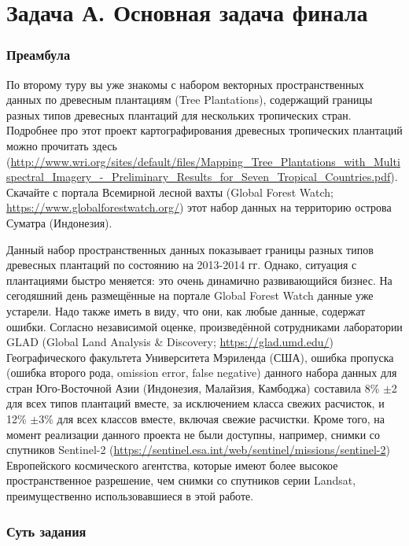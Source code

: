 \section{Задача А. Основная задача финала}

\subsubsection*{Преамбула}

По второму туру вы уже знакомы с набором векторных пространственных данных по древесным плантациям (Tree Plantations), содержащий границы разных типов древесных плантаций для нескольких тропических стран. Подробнее про этот проект картографирования древесных тропических плантаций можно прочитать здесь (\url{http://www.wri.org/sites/default/files/Mapping_Tree_Plantations_with_Mult}\linebreak \url{ispectral_Imagery_-_Preliminary_Results_for_Seven_Tropical_Countries.pdf}). \linebreak Скачайте с портала Всемирной лесной вахты (Global Forest Watch; \url{https://www.globalforestwatch.org/}) этот набор данных на территорию острова Суматра (Индонезия).

Данный набор пространственных данных показывает границы разных типов древесных плантаций по состоянию на 2013-2014 гг. Однако, ситуация с плантациями быстро меняется: это очень динамично развивающийся бизнес. На сегодяшний день размещённые на портале Global Forest Watch данные уже устарели. Надо также иметь в виду, что они, как любые данные, содержат ошибки. Согласно независимой оценке, произведённой сотрудниками лаборатории GLAD (Global Land Analysis \& Discovery; \url{https://glad.umd.edu/}) Географического факультета Университета Мэриленда (США), ошибка пропуска (ошибка второго рода, omission error, false negative) данного набора данных для стран Юго-Восточной Азии (Индонезия, Малайзия, Камбоджа) составила 8\% $\pm$2 для всех типов плантаций вместе, за исключением класса свежих расчисток, и 12\% $\pm$3\% для всех классов вместе, включая свежие расчистки. Кроме того, на момент реализации данного проекта не были доступны, например, снимки со спутников Sentinel-2 (\url{https://sentinel.esa.int/web/sentinel/missions/sentinel-2}) Европейского космического агентства, которые имеют более высокое пространственное разрешение, чем снимки со спутников серии Landsat, преимущественно использовавшиеся в этой работе.

\subsubsection*{Суть задания}

